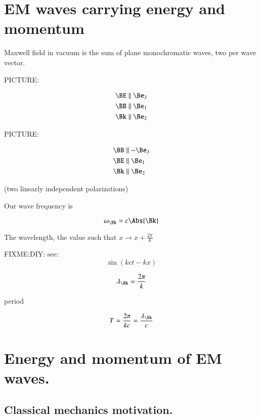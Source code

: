 \section{EM waves carrying energy and momentum}

Maxwell field in vacuum is the sum of plane monochromatic waves, two per wave vector.

PICTURE:

\begin{align*}
\BE &\parallel \Be_3 \\
\BB &\parallel \Be_1 \\
\Bk &\parallel \Be_2
\end{align*}

PICTURE:

\begin{align*}
\BB &\parallel -\Be_3 \\
\BE &\parallel \Be_1 \\
\Bk &\parallel \Be_2
\end{align*}

(two linearly independent polarizations)

Our wave frequency is

\begin{equation}\label{eqn:relativisticElectrodynamicsL16:370}
\omega_{\Bk} = c \Abs{\Bk}
\end{equation}

The wavelength, the value such that $x \rightarrow x + \frac{2 \pi}{k}$

FIXME:DIY: see:
\begin{equation}\label{eqn:relativisticElectrodynamicsL16:390}
\sin(k c t - k x)
\end{equation}

\begin{equation}\label{eqn:relativisticElectrodynamicsL16:410}
\lambda_{\Bk} = \frac{2 \pi}{k}
\end{equation}

period

\begin{equation}\label{eqn:relativisticElectrodynamicsL16:430}
T = \frac{ 2 \pi} {k c} = \frac{\lambda_\Bk}{c}
\end{equation}

\section{Energy and momentum of EM waves.}

\subsection{Classical mechanics motivation.}


